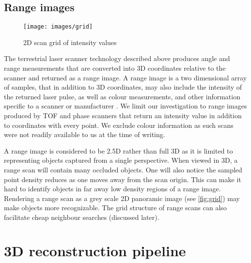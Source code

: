 \subsection{Range images} \label{sec:data}


\begin{figure}[ht]
  \centering
  \texttt{[image: images/grid]}
  \caption{2D scan grid of intensity values \protect\footnotemark}
  \label{fig:grid}
\end{figure}


The terrestrial laser scanner technology described above produces angle and range measurements that are converted into 3D coordinates relative to the scanner and returned as a range image. A range image is a two dimensional array of samples, that in addition to 3D coordinates, may also include the intensity of the returned laser pulse, as well as colour measurements, and other information specific to a scanner or manufacturer \cite{Frohlich2004}. We limit our investigation to range images produced by TOF and phase scanners that return an intensity value in addition to coordinates with every point. We exclude colour information as such scans were not readily available to us at the time of writing.

A range image is considered to be 2.5D rather than full 3D as it is limited to representing objects captured from a single perspective. When viewed in 3D, a range scan will contain many occluded objects. One will also notice the sampled point density reduces as one moves away from the scan origin. This can make it hard to identify objects in far away low density regions of a range image. Rendering a range scan as a grey scale 2D panoramic image (see \autoref{fig:grid}) may make objects more recognizable. The grid structure of range scans can also facilitate cheap neighbour searches (discussed later).

\section{3D reconstruction pipeline} \label{sec:pipeline}


